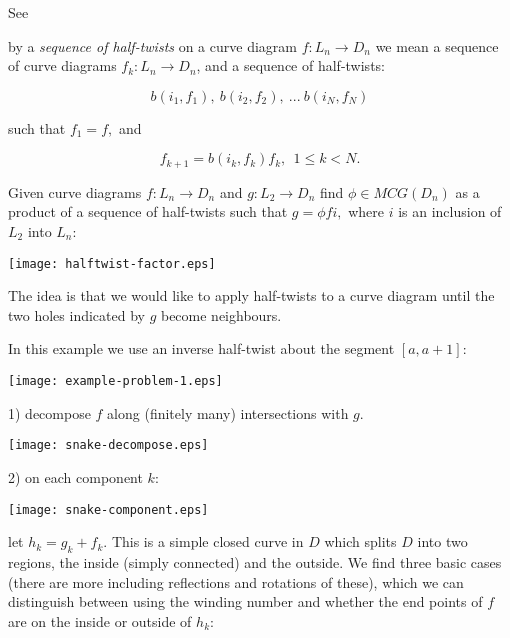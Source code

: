 \documentclass[11pt,a4paper]{article}
\begin{document}
See \cite{Pfeifer12, Pfeifer14}




 by a {\it sequence of half-twists} on a curve
diagram $f:L_n\to D_n$ we mean a
sequence of curve diagrams $f_k: L_n\to D_n$, and a sequence of half-twists:

        $$ b(i_1, f_1),\ b(i_2, f_2),\ ...\ b(i_N, f_N) $$

such that $f_1=f,$ and

        $$ f_{k+1} = b(i_k, f_k) f_k,\ \  \text{} 1\leq k<N.$$


Given curve diagrams $f:L_n\to D_n$ and $g:L_2\to D_n$
find $\phi\in MCG(D_n)$ as a product of
a sequence of half-twists such that
$g = \phi f i,$ where $i$ is an inclusion of $L_2$ into $L_n:$

\begin{center}
\texttt{[image: halftwist-factor.eps]}
\end{center}

The idea is that we would like to apply half-twists to a curve diagram
until the two holes indicated by $g$ become neighbours.


In this example we use an inverse half-twist about the segment $[a, a+1]:$

\begin{center}
\texttt{[image: example-problem-1.eps]}
\end{center}



1) decompose $f$ along (finitely many) intersections
with $g.$

\begin{center}
\texttt{[image: snake-decompose.eps]}
\end{center}


2) on each component $k$:

\begin{center}
\texttt{[image: snake-component.eps]}
\end{center}

let $h_k = g_k + f_k.$
This is a simple closed curve in $D$ which splits $D$
into two regions, the inside (simply connected) and the
outside.
We find three basic cases (there are more including reflections
and rotations of these), which we can distinguish between
using the winding number and whether the end points
of $f$ are on the inside or outside of $h_k$:
\end{document}
